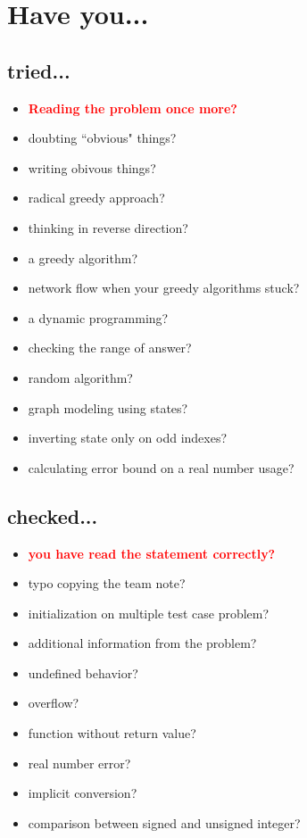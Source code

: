 \documentclass[portrait, 8pt, a4paper, oneside, twocolumn]{extarticle}
\begin{document}
\maketitlepage

\pagebreak 


\section{Have you...}

\subsection{tried...}

\begin{itemize}
    \item \textcolor{red}{\textbf{Reading the problem once more?}}
    \item doubting ``obvious" things?
    \item writing obivous things?
    \item radical greedy approach?
    \item thinking in reverse direction?
    \item a greedy algorithm?
    \item network flow when your greedy algorithms stuck?
    \item a dynamic programming?
    \item checking the range of answer?
    \item random algorithm?
    \item graph modeling using states?
    \item inverting state only on odd indexes?
    \item calculating error bound on a real number usage?
\end{itemize}

\subsection{checked...}

\begin{itemize}
    \item \textcolor{red}{\textbf{you have read the statement correctly?}}
    \item typo copying the team note?
    \item initialization on multiple test case problem?
    \item additional information from the problem?
    \item undefined behavior?
    \item overflow?
    \item function without return value?
    \item real number error?
    \item implicit conversion?
    \item comparison between signed and unsigned integer?
\end{itemize}
\end{document}
